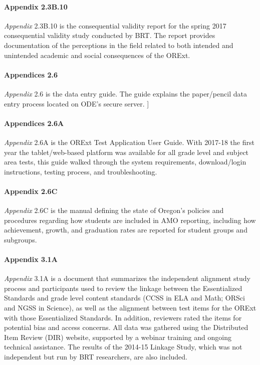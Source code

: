 \documentclass[]{article}
\let\oldparagraph\paragraph
\renewcommand{\paragraph}[1]{\oldparagraph{#1}\mbox{}}
\begin{document}
\paragraph{Appendix 2.3B.10}\label{appendix-2.3b.10}

\emph{Appendix} 2.3B.10 is the consequential validity report for the
spring 2017 consequential validity study conducted by BRT. The report
provides documentation of the perceptions in the field related to both
intended and unintended academic and social consequences of the ORExt.

\paragraph{Appendices 2.6}\label{appendices-2.6}

\emph{Appendix} 2.6 is the data entry guide. The guide explains the
paper/pencil data entry process located on ODE's secure server. {]}

\paragraph{Appendices 2.6A}\label{appendices-2.6a}

\emph{Appendix} 2.6A is the ORExt Test Application User Guide. With
2017-18 the first year the tablet/web-based platform was available for
all grade level and subject area tests, this guide walked through the
system requirements, download/login instructions, testing process, and
troubleshooting.

\paragraph{Appendix 2.6C}\label{appendix-2.6c}

\emph{Appendix} 2.6C is the manual defining the state of Oregon's
policies and procedures regarding how students are included in AMO
reporting, including how achievement, growth, and graduation rates are
reported for student groups and subgroups.

\paragraph{Appendix 3.1A}\label{appendix-3.1a}

\emph{Appendix} 3.1A is a document that summarizes the independent
alignment study process and participants used to review the linkage
between the Essentialized Standards and grade level content standards
(CCSS in ELA and Math; ORSci and NGSS in Science), as well as the
alignment between test items for the ORExt with those Essentialized
Standards. In addition, reviewers rated the items for potential bias and
access concerns. All data was gathered using the Distributed Item Review
(DIR) website, supported by a webinar training and ongoing technical
assistance. The results of the 2014-15 Linkage Study, which was not
independent but run by BRT researchers, are also included.
\end{document}
